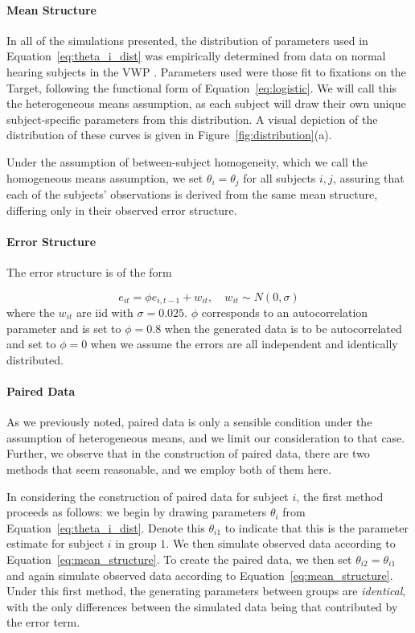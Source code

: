 \documentclass{article}
\begin{document}
\paragraph{Mean Structure} In all of the simulations presented, the distribution of parameters used in Equation~\ref{eq:theta_i_dist} was empirically determined from data on normal hearing subjects in the VWP \citep{FarrisTrimble2014}. Parameters used were those fit to fixations on the Target, following the functional form of Equation~\ref{eq:logistic}. We will call this the heterogeneous means assumption, as each subject will draw their own unique subject-specific parameters from this distribution. A visual depiction of the distribution of these curves is given in Figure~\ref{fig:distribution}(a).

Under the assumption of between-subject homogeneity, which we call the homogeneous means assumption, we set $\theta_i = \theta_j$ for all subjects $i,j$, assuring that each of the subjects' observations is derived from the same mean structure, differing only in their observed error structure. 


\paragraph{Error Structure} The error structure is of the form

\begin{equation}
e_{it} = \phi e_{i, t-1} + w_{it}, \quad w_{it} \sim N(0, \sigma)
\end{equation}
where the $w_{it}$ are iid with $\sigma = 0.025$. $\phi$ corresponds to an autocorrelation parameter and is set to $\phi = 0.8$ when the generated data is to be autocorrelated and set to $\phi = 0$ when we assume the errors are all independent and identically distributed. 

\paragraph{Paired Data} As we previously noted, paired data is only a sensible condition under the assumption of heterogeneous means, and we limit our consideration to that case. Further, we observe that in the construction of paired data, there are two methods that seem reasonable, and we employ both of them here. 

In considering the construction of paired data for subject $i$, the first method proceeds as follows: we begin by drawing parameters $\theta_i$ from Equation~\ref{eq:theta_i_dist}. Denote this $\theta_{i1}$ to indicate that this is the parameter estimate for subject $i$ in group $1$. We then simulate observed data according to Equation~\ref{eq:mean_structure}. To create the paired data, we then set $\theta_{i2} = \theta_{i1}$ and again simulate observed data according to Equation~\ref{eq:mean_structure}. Under this first method, the generating parameters between groups are \textit{identical}, with the only differences between the simulated data being that contributed by the error term.
\end{document}
